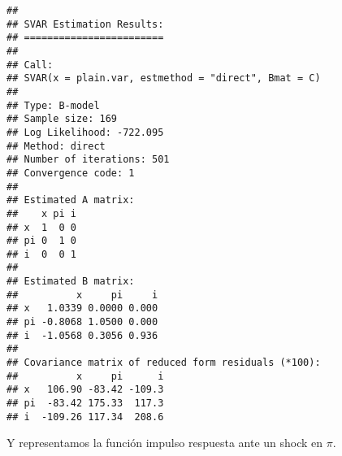 \documentclass[
]{book}
\begin{document}
\begin{verbatim}
## 
## SVAR Estimation Results:
## ======================== 
## 
## Call:
## SVAR(x = plain.var, estmethod = "direct", Bmat = C)
## 
## Type: B-model 
## Sample size: 169 
## Log Likelihood: -722.095 
## Method: direct 
## Number of iterations: 501 
## Convergence code: 1 
## 
## Estimated A matrix:
##    x pi i
## x  1  0 0
## pi 0  1 0
## i  0  0 1
## 
## Estimated B matrix:
##          x     pi     i
## x   1.0339 0.0000 0.000
## pi -0.8068 1.0500 0.000
## i  -1.0568 0.3056 0.936
## 
## Covariance matrix of reduced form residuals (*100):
##          x     pi      i
## x   106.90 -83.42 -109.3
## pi  -83.42 175.33  117.3
## i  -109.26 117.34  208.6
\end{verbatim}

Y representamos la función impulso respuesta ante un shock en \(\pi\).
\end{document}
